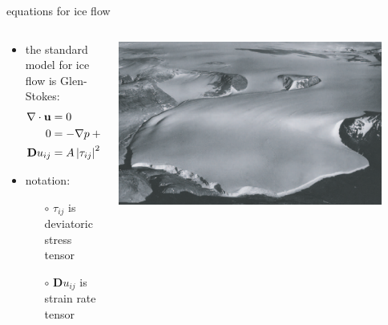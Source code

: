 \documentclass[10pt,hyperref={pdfpagelabels=true}]{beamer}
\begin{document}
\begin{frame}{equations for ice flow}

\begin{columns}
\begin{column}{0.65\textwidth}
\begin{itemize}
\item the \alert{standard model for ice flow} is Glen-Stokes:
\begin{align*}
\nabla \cdot \mathbf{u} &= 0 &&\text{\emph{incompressibility}} \\
0 &= - \nabla p + \nabla \cdot \tau_{ij} + \rho \mathbf{g} &&\text{\emph{stress balance}} \\
\mathbf{D}u_{ij} &= A \left|\tau_{ij}\right|^2 \tau_{ij} &&\text{\emph{Glen flow law}}
\end{align*}
\item notation:
  \begin{itemize}
  \item[$\circ$] $\tau_{ij}$ is deviatoric stress tensor
  \item[$\circ$] $\mathbf{D}u_{ij}$ is strain rate tensor
  \end{itemize}
\end{itemize}
\end{column}
\begin{column}{0.35\textwidth}

\hfill\includegraphics[width=0.9\textwidth]{polaris}

\bigskip\bigskip


\end{column}
\end{columns}
\end{frame}
\end{document}

